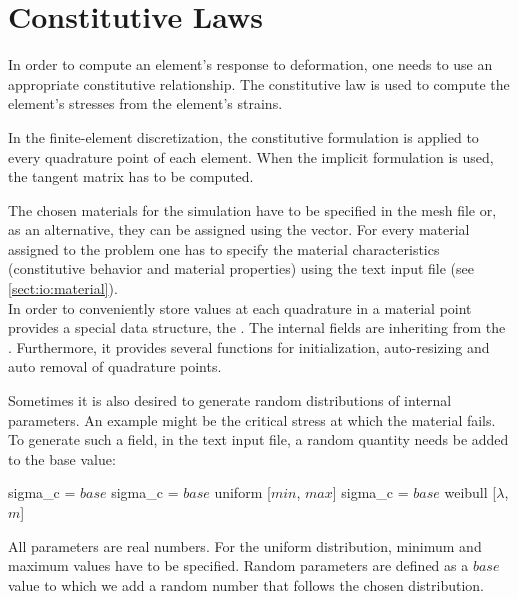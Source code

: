 \section{Constitutive Laws \label{sect:smm:CL}}
In order to compute an element's response to deformation, one needs to
use an appropriate constitutive relationship. The constitutive law is
used to compute the element's stresses from the element's strains.

In the finite-element discretization, the constitutive formulation is
applied to every quadrature point of each element. When the implicit
formulation is used, the tangent matrix has to be computed.

The chosen materials for the simulation have to be specified in the
mesh file or, as an alternative, they can be assigned using the
 vector.  For every material assigned to the
problem one has to specify the material characteristics (constitutive
behavior and material properties) using the text input file (see \ref{sect:io:material}).\\
In order to conveniently store values at each quadrature in a material
point \akantu provides a special data structure, the
. The internal fields are inheriting from the
.  Furthermore, it provides several functions for
initialization, auto-resizing and auto removal of quadrature points.

Sometimes it is also desired to generate random distributions of
internal parameters. An example might be the critical stress at which the
material fails. To generate such a field, in the text input file,
a random quantity needs be added to the base value:
\begin{cpp}
  sigma_c = $base$
  sigma_c = $base$ uniform [$min$, $max$]
  sigma_c = $base$ weibull [$\lambda$, $m$]
\end{cpp}

All parameters are real numbers. For the uniform distribution, minimum
and maximum values have to be specified.
Random parameters are defined as a $base$ value to which we add a random number
that follows the chosen distribution.

